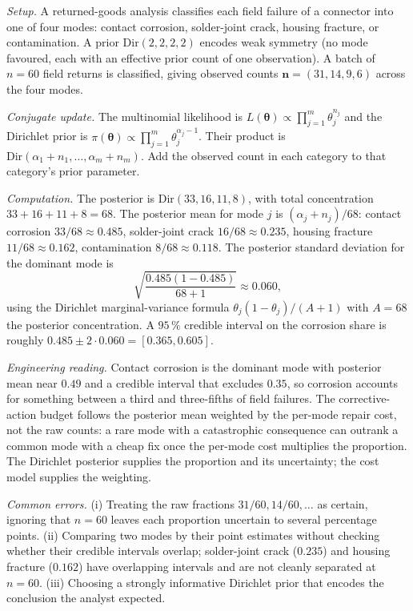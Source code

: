 \textit{Setup.} A returned-goods analysis classifies each field
failure of a connector into one of four modes: contact corrosion,
solder-joint crack, housing fracture, or contamination. A prior
$\text{Dir}(2, 2, 2, 2)$ encodes weak symmetry (no mode favoured,
each with an effective prior count of one observation). A batch of
$n = 60$ field returns is classified, giving observed counts
$\boldsymbol n = (31, 14, 9, 6)$ across the four modes.

\textit{Conjugate update.} The multinomial likelihood is
$L(\boldsymbol\theta) \propto \prod_{j=1}^{m} \theta_{j}^{n_{j}}$
and the Dirichlet prior is $\pi(\boldsymbol\theta) \propto
\prod_{j=1}^{m} \theta_{j}^{\alpha_{j} - 1}$. Their product is
$\text{Dir}(\alpha_{1} + n_{1}, \ldots, \alpha_{m} + n_{m})$. Add
the observed count in each category to that category's prior
parameter.

\textit{Computation.} The posterior is
$\text{Dir}(33, 16, 11, 8)$, with total concentration
$33 + 16 + 11 + 8 = 68$. The posterior mean for mode $j$ is
$(\alpha_{j} + n_{j})/68$: contact corrosion
$33/68 \approx 0.485$, solder-joint crack $16/68 \approx 0.235$,
housing fracture $11/68 \approx 0.162$, contamination
$8/68 \approx 0.118$. The posterior standard deviation for the
dominant mode is
\[
\sqrt{\frac{0.485(1 - 0.485)}{68 + 1}} \approx 0.060,
\]
using the Dirichlet marginal-variance formula
$\theta_{j}(1 - \theta_{j})/(A + 1)$ with $A = 68$ the posterior
concentration. A $95 \,\%$ credible interval on the corrosion
share is roughly $0.485 \pm 2 \cdot 0.060 = [0.365, 0.605]$.

\textit{Engineering reading.} Contact corrosion is the dominant
mode with posterior mean near $0.49$ and a credible interval that
excludes $0.35$, so corrosion accounts for something between a
third and three-fifths of field failures. The corrective-action
budget follows the posterior mean weighted by the per-mode repair
cost, not the raw counts: a rare mode with a catastrophic
consequence can outrank a common mode with a cheap fix once the
per-mode cost multiplies the proportion. The Dirichlet posterior
supplies the proportion and its uncertainty; the cost model
supplies the weighting.

\textit{Common errors.} (i) Treating the raw fractions
$31/60, 14/60, \ldots$ as certain, ignoring that $n = 60$ leaves
each proportion uncertain to several percentage points. (ii)
Comparing two modes by their point estimates without checking
whether their credible intervals overlap; solder-joint crack
($0.235$) and housing fracture ($0.162$) have overlapping
intervals and are not cleanly separated at $n = 60$. (iii)
Choosing a strongly informative Dirichlet prior that encodes the
conclusion the analyst expected.

